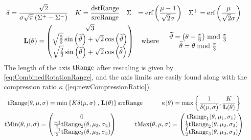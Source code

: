 \begin{gather*}
 \begin{aligned}
  \delta  &= \frac{ \sqrt{2} }{ \sigma \sqrt{\pi }  \left(\Sigma^+-\Sigma^-\right)} & 
 K & =  \frac{\text{dstRange}}{\text{srcRange}}  & 
 \Sigma^- &= \text{erf}\left(\frac{\mu -1}{\sqrt{2} \sigma }\right) &
 \Sigma^+ &= \text{erf}\left(\frac{\mu }{\sqrt{2} \sigma }\right) 
  \end{aligned} \\
  \mathbf{L}(\theta) =
  \begin{pmatrix}
  \sqrt{3} \\
   \sqrt{\frac{2}{3}} \sin \left(\widetilde{\vartheta}\right) + \sqrt{2} \cos \left(\widetilde{\vartheta}\right) \\  
  \sqrt{\frac{2}{3}} \sin \left(\widetilde{\theta}\right) + \sqrt{2} \cos \left(\widetilde{\theta}\right) 
  \end{pmatrix}
  \quad \text{where}  \quad 
  \begin{array}{c}
  \widetilde{\vartheta} = \left(\theta - \frac{\pi}{6}\right) \bmod \frac{\pi }{3} \\
  \widetilde{\theta} = \theta  \bmod \frac{\pi }{3} 
  \end{array}
\end{gather*}
The length of the axis $\text{tRange}$ after rescaling is given by \ref{eq:CombinedRotationRange}, and the axis limits are easily found along with 
the compression ratio $\kappa$ (\ref{eq:newCompressionRatio}).
\begin{gather*}
\begin{aligned}
 \text{tRange}(\theta,\mu,\sigma)   & =  \min\left\{K \delta(\mu,\sigma) \right. ,  \left. \mathbf{L}(\theta) \right\}  \text{srcRange} \quad&\quad
 \kappa(\theta) & = \max\left\{ \frac{1}{\delta(\mu,\sigma) }   , \frac{K}{\mathbf{L}(\theta)} \right\}  
 \end{aligned} \\
 \begin{aligned}
  \text{tMin}(\theta,\mu,\sigma)   & =
 \begin{pmatrix}
 0 \\
  \frac{-1 }{2} \text{tRange}_2(\theta,\mu_2,\sigma_2) \\  
  \frac{-1 }{2} \text{tRange}_3(\theta,\mu_3,\sigma_3) \\  
 \end{pmatrix} \quad & \quad
  \text{tMax}(\theta,\mu,\sigma)   & =
 \begin{pmatrix}
  \text{tRange}_1(\theta,\mu_1,\sigma_1)  \\
  \frac{1 }{2} \text{tRange}_2(\theta,\mu_2,\sigma_2)  \\  
  \frac{1 }{2} \text{tRange}_3(\theta,\mu_3,\sigma_3)  \\  
 \end{pmatrix} 
 \end{aligned}
\end{gather*}


